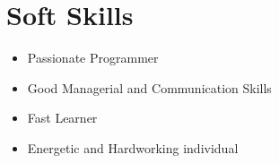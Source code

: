 \documentclass[11pt,a4paper,sans]{moderncv} %
\begin{document}
\begin{comment}
\section{Masters Thesis}

\cvitem{Title}{\emph{Money Is The Root Of All Evil -- Or Is It?}}
\cvitem{Supervisors}{Professor James Smith \& Associate Professor Jane Smith}
\cvitem{Description}{This thesis explored the idea that money has been the cause of untold anguish and suffering in the world. I found that it has, in fact, not.}
\end{comment}



\section{\textbf{Soft Skills}}
		
\cvitem{}
{
\begin{itemize}
	\item Passionate Programmer
	\item Good Managerial and Communication Skills
	\item Fast Learner
	\item Energetic and Hardworking individual
\end{itemize}
}
\end{document}
